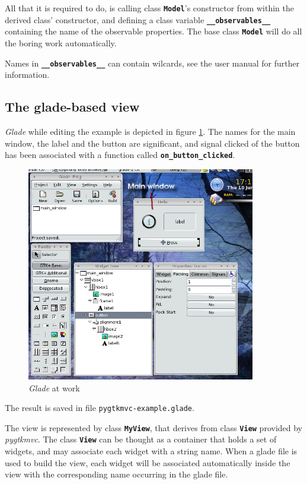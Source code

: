 \documentclass{article}
\newcommand{\kw}[1]{\emph{#1}\xspace}
\newcommand{\appl}[1]{\textsl{#1}\xspace}
\newcommand{\glade}{\appl{Glade}}
\newcommand{\pygtkmvc}{\kw{pygtkmvc}}
\newcommand{\file}[1]{\texttt{#1}\xspace}
\newcommand{\codename}[1]{\texttt{\bfseries \textcolor {codecolor}{#1}}\xspace}
\begin{document}
All that it is required to do, is calling class \codename{Model}'s
constructor from within the derived class' constructor, and
defining a class variable \codename{\_\_observables\_\_} containing
the name of the observable properties. The base class
\codename{Model} will do all the boring work automatically.

Names in \codename{\_\_observables\_\_} can contain wilcards, see
the user manual for further information.

\subsection{The glade-based view}
\glade while editing the example is depicted in figure
\ref{fig:glade}. The names for the main window, the label and the
button are significant, and signal clicked of the button has been
associated with a function called \codename{on\_button\_clicked}.

\begin{figure}[htbp]
\begin{center}
\includegraphics[width=10cm]{eps/glade}
\caption{\label{fig:glade}\glade at work}
\end{center}
\end{figure}


The result is saved in file \file{pygtkmvc-example.glade}.

The view is represented by class \codename{MyView}, that derives from
class \codename{View} provided by \pygtkmvc. The class \codename{View}
can be thought as a container that holds a set of widgets, and may
associate each widget with a string name. When a glade file is used to
build the view, each widget will be associated automatically inside
the view with the corresponding name occurring in the glade file.
\end{document}
